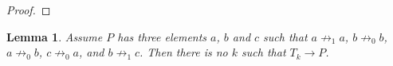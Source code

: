 \documentclass[a4paper]{article}
\newtheorem{lemma}[theorem]{Lemma}
\begin{document}
\begin{proof}
\end{proof}

\begin{lemma} \label{second killer lemma}
 Assume $P$ has three elements $a$, $b$ and $c$ such that $a \not
\rightarrow_1 a$, $b \not \rightarrow_0 b$, $a \not \rightarrow_0 b$, $c
\not \rightarrow_0 a$, and $b \not \rightarrow_1 c$. Then there is no
$k$ such that $T_k \to P$.
\end{lemma}
\end{document}
